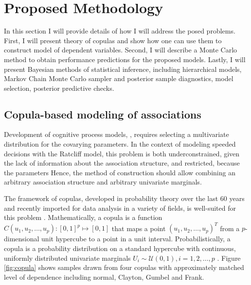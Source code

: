 \section{Proposed Methodology}

In this section I will provide details of how I will address the posed
problems. First, I will present theory of copulas and show how one can use
them to construct  model of dependent variables. Second, I
will describe a Monte Carlo method to obtain performance predictions for
the proposed models. Lastly, I will present Bayesian methods of statistical
inference, including hierarchical models, Markov Chain Monte Carlo sampler
and posterior sample diagnostics, model selection,  posterior
predictive checks.  

\subsection{Copula-based modeling of associations}

Development of cognitive process models, , requires selecting a multivariate distribution for
the covarying parameters. In the context of modeling speeded decisions with
the Ratcliff model, this problem is both underconstrained, given the lack
of information about the association structure, and restricted, because the
parameters  Hence, the method of
construction should allow combining an arbitrary association structure and
arbitrary univariate marginals.


The framework of copulas, developed in probability theory over the last 60
years and recently imported for data analysis in a variety of fields, is
well-suited for this problem
\citep{Skl1959,Joe1997,Nel2007,BerWoo2008}. Mathematically, a copula is a
function $C(u_1, u_2, \dots, u_p): [0, 1]^p \mapsto [0, 1]$ that maps a
point $(u_1, u_2, \ldots, u_p)^T$ from a $p$-dimensional unit hypercube to
a point in a unit interval.  Probabilistically, a copula is a probability
distribution on a standard hypercube with continuous, uniformly distributed
univariate marginals $U_i \sim \mathcal{U}(0, 1), i = 1, 2, \dots, p$
. Figure \ref{fig:copula}
shows samples drawn from four copulas with approximately matched level of
dependence including normal, Clayton, Gumbel and Frank.


